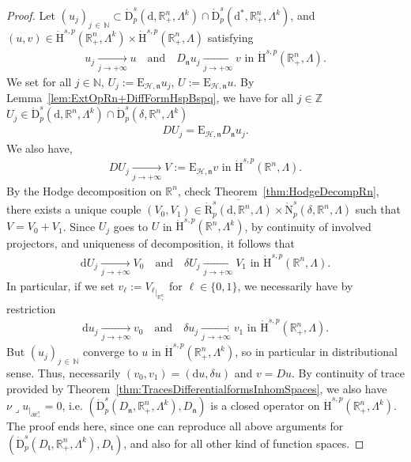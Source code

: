\documentclass[AHL,Unicode,longabstracts,published]{cedram}
\newcommand{\bbR}{\mathbb{R}}
\newcommand{\bbN}{\mathbb{N}}
\newcommand{\bbZ}{\mathbb{Z}}
\newcommand{\rmH}{\mathrm{H}}%
\newcommand{\rmd}{\mathrm{d}}
\newcommand{\rmD}{\mathrm{D}}
\newcommand{\rmR}{\mathrm{R}}
\newcommand{\rmE}{\mathrm{E}}
\newcommand{\rmN}{\mathrm{N}}
\newcommand{\clH}{\mathcal{H}}
\newcommand{\fkn}{\mathfrak{n}}
\newcommand{\fkt}{\mathfrak{t}}
\newcommand{\iprod}{\mathbin{\lrcorner}}
\begin{document}
\begin{proof}
Let $(u_j)_{j\,\in\,\bbN }\subset \dot{\rmD}^{s}_{p}(\rmd,\bbR^n_+,\Lambda^k)\cap \dot{\rmD}^{s}_{p}(\rmd^\ast,\bbR^n_+,\Lambda^k)$, and $(u,v)\in\dot{\rmH}^{s,p}(\bbR^n_+,\Lambda^k)\times\dot{\rmH}^{s,p}(\bbR^n_+, \Lambda)$ satisfying
\begin{align*}
u_j \xrightarrow[j\rightarrow +\infty]{} u \quad\text{and}\quad D_\fkn u_j \xrightarrow[j\rightarrow +\infty]{} v \text{ in } \dot{\rmH}^{s,p}\left(\bbR^n_+,\Lambda\right).
\end{align*}
We set for all $j\in\bbN $, $U_j:=\rmE_{\clH,\fkn}u_j$, $U:=\rmE _{\clH,\fkn}u$. By Lemma~\ref{lem:ExtOpRn+DiffFormHspBspq}, we have for all $j\in\bbZ$ $U_j\in\dot{\rmD}^{s}_{p}(\rmd,\bbR^n,\Lambda^k)\cap \dot{\rmD}^{s}_{p}(\delta,\bbR^n,\Lambda^k)$
\begin{align*}
D U_j = \rmE _{\clH,\fkn}D_\fkn u_j.
\end{align*}
We also have,
\begin{align*}
D U_j \xrightarrow[j\rightarrow +\infty]{} V:=\rmE _{\clH,\fkn}v\text{ in } \dot{\rmH}^{s,p}(\bbR^n,\Lambda).
\end{align*}
By the Hodge decomposition on $\bbR^n$, check Theorem~\ref{thm:HodgeDecompRn}, there exists a unique couple $({V}_{0},{V}_{1})\in \overline{\dot{\rmR}^{s}_{p}({\rmd},\bbR^n,\Lambda)}\times \dot{\rmN}^{s}_{p}(\delta,\bbR^n,\Lambda)$ such that $V={V}_{0}+{V}_{1}$. Since $U_j$ goes to $U$ in $\dot{\rmH}^{s,p}(\bbR^n,\Lambda^k)$, by continuity of involved projectors, and uniqueness of decomposition, it follows that
\begin{align*}
\rmd U_j \xrightarrow[j\rightarrow +\infty]{} V_0 \quad\text{and}\quad \delta U_j \xrightarrow[j\rightarrow +\infty]{} V_1 \text{ in } \dot{\rmH}^{s,p}\left(\bbR^n,\Lambda\right).
\end{align*}
In particular, if we set $v_\ell:= {V_\ell}_{|_{\bbR^n_+}}$ for $\ell\in\{0,1\}$, we necessarily have by restriction
\begin{align*}
\rmd u_j \xrightarrow[j\rightarrow +\infty]{} v_0 \quad\text{and}\quad \delta u_j \xrightarrow[j\rightarrow +\infty]{} v_1 \text{ in } \dot{\rmH}^{s,p}\left(\bbR^n_+,\Lambda\right).
\end{align*}
But $(u_j)_{j\,\in\,\bbN }$ converge to $u$ in $\dot{\rmH}^{s,p}(\bbR^n_+,\Lambda^k)$, so in particular in distributional sense. Thus, necessarily $(v_0,v_1)=(\rmd u,\delta u)$ and $v=D u$. By continuity of trace provided by Theorem~\ref{thm:TracesDifferentialformsInhomSpaces}, we also have $\nu\iprod u_{|_{\partial\bbR^n_+}} =0$, i.e. $(\dot{\rmD}^{s}_p(D_{\fkn},\bbR^n_+,\Lambda^k),D_{\fkn})$ is a closed operator on $\dot{\rmH}^{s,p}(\bbR^n_+,\Lambda^k)$. The proof ends here, since one can reproduce all above arguments for $(\dot{\rmD}^{s}_p(D_{\fkt},\bbR^n_+,\Lambda^k),D_{\fkt})$, and also for all other kind of function spaces.
\end{proof}
\end{document}
